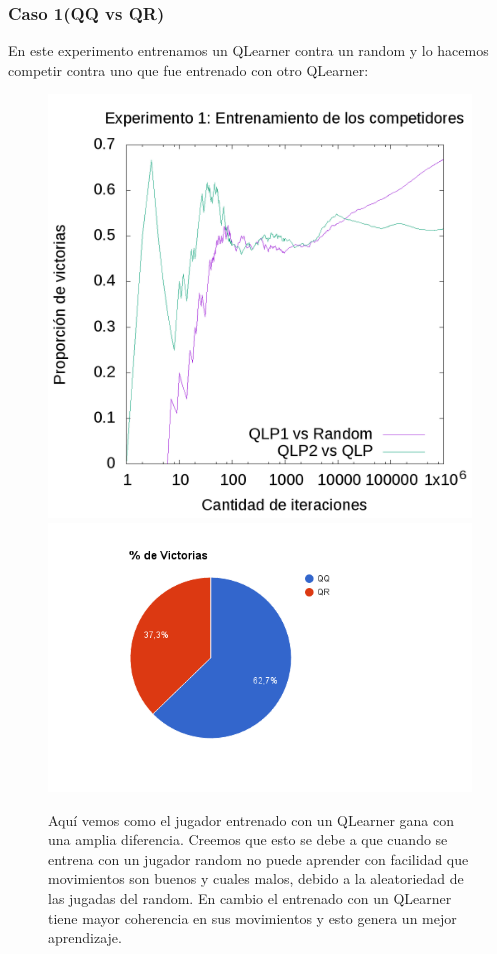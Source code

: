 \documentclass[10pt, a4paper]{article}
\begin{document}
\subsubsection{Caso 1(QQ vs QR)}


En este experimento entrenamos un QLearner contra un random y lo hacemos competir contra uno que fue entrenado con otro QLearner:


\begin{figure}[H]
  \begin{minipage}[c]{1\textwidth}
  \includegraphics[scale=0.2]{E1train.png}
  \includegraphics[scale=0.3]{QRvsQQ.png}
  \caption{Aquí vemos como el jugador entrenado con un QLearner gana con una amplia diferencia. Creemos que esto se debe a que cuando se entrena con un jugador random no puede aprender con facilidad que movimientos son buenos y cuales malos, debido a la aleatoriedad de las jugadas del random. En cambio el entrenado con un QLearner tiene mayor coherencia en sus movimientos y esto genera un mejor aprendizaje.}
  \end{minipage}
\end{figure}
\end{document}
